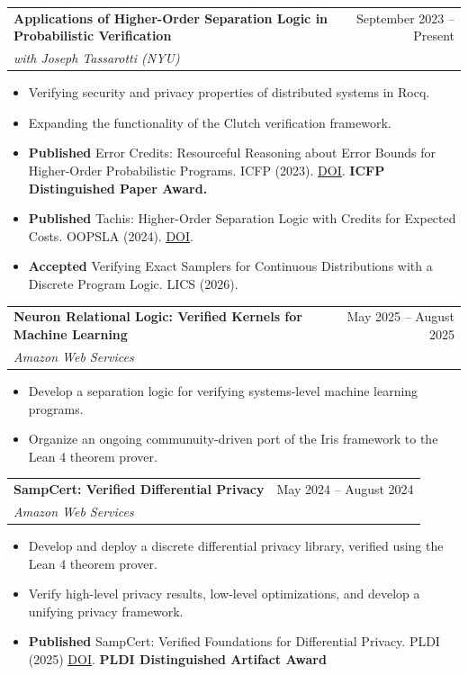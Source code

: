 \documentclass[letterpaper,11pt]{article}
\makeatletter
\newcommand{\resumeItem}[1]{
  \item\small{
    {#1 \vspace{-2pt}}
  }
}
\newcommand{\resumeSubheading}[4]{
  \vspace{-2pt}\item
    \begin{tabular*}{0.97\textwidth}[t]{l@{\extracolsep{\fill}}r}
      \textbf{#1} & #2 \\
      \textit{\small#3} & \textit{\small #4} \\
    \end{tabular*}\vspace{-7pt}
}
\newcommand{\resumeSubSubheading}[2]{
    \item
    \begin{tabular*}{0.97\textwidth}{l@{\extracolsep{\fill}}r}
      \textit{\small#1} & \textit{\small #2} \\
    \end{tabular*}\vspace{-7pt}
}
\newcommand{\resumeSubHeadingListEnd}{\end{itemize}}
\newcommand{\resumeItemListStart}{\begin{itemize}}
\newcommand{\resumeItemListEnd}{\end{itemize}\vspace{-5pt}}
\makeatother
\begin{document}
    \resumeSubheading
      {Applications of Higher-Order Separation Logic in Probabilistic Verification}{September 2023 -- Present}
      {with Joseph Tassarotti (NYU)}{}
      \resumeItemListStart
        \resumeItem{Verifying security and privacy properties of distributed systems in Rocq.}
        \resumeItem{Expanding the functionality of the Clutch verification framework.}
        \resumeItem{\textbf{Published} Error Credits: Resourceful Reasoning about Error Bounds for Higher-Order Probabilistic Programs. ICFP (2023). \href{https://dl.acm.org/doi/10.1145/3674635}{\ul{DOI}}. \textbf{ICFP Distinguished Paper Award.}}
        \resumeItem{\textbf{Published} Tachis: Higher-Order Separation Logic with Credits for Expected Costs. OOPSLA (2024). \href{https://dl.acm.org/doi/10.1145/3689753}{\ul{DOI}}.}
        \resumeItem{\textbf{Accepted} Verifying Exact Samplers for Continuous Distributions with a Discrete Program Logic. LICS (2026).}
      \resumeItemListEnd

    \resumeSubheading
      {Neuron Relational Logic: Verified Kernels for Machine Learning}{May 2025 -- August 2025}
      {Amazon Web Services}{}
      \resumeItemListStart
        \resumeItem{Develop a separation logic for verifying systems-level machine learning programs. }
        \resumeItem{Organize an ongoing communuity-driven port of the Iris framework to the Lean 4 theorem prover. }
      \resumeItemListEnd

    \resumeSubheading
      {SampCert: Verified Differential Privacy}{May 2024 -- August 2024}
      {Amazon Web Services}{}
      \resumeItemListStart
        \resumeItem{Develop and deploy a discrete differential privacy library, verified using the Lean 4 theorem prover. }
        \resumeItem{Verify high-level privacy results, low-level optimizations, and develop a unifying privacy framework. }
        \resumeItem{\textbf{Published} SampCert: Verified Foundations for Differential Privacy. PLDI (2025) \href{https://doi.org/10.1145/3729294}{\ul{DOI}}. \textbf{PLDI Distinguished Artifact Award}}
      \resumeItemListEnd

\end{document}
